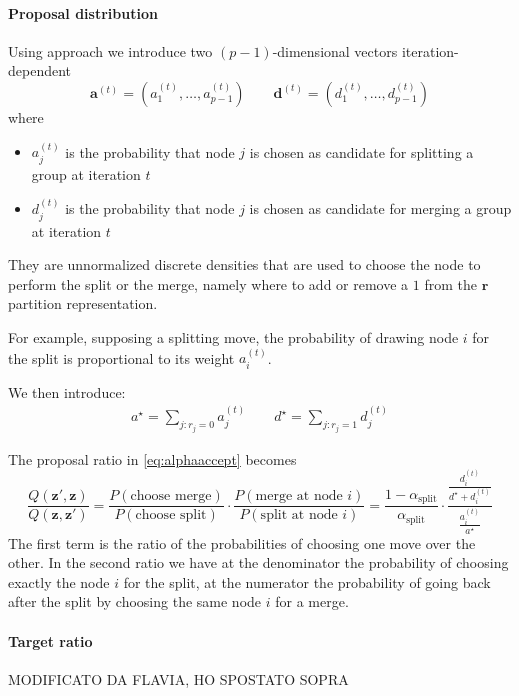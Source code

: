 \paragraph{Proposal distribution}\label{par:proposalratio}

Using \textcite{bensonAdaptiveMCMCMultiple2018} approach we introduce two $( p-1)$-dimensional vectors iteration-dependent
\begin{equation*}
\mathbf{a}^{( t)} =( a_{1}^{( t)} ,\dotsc ,a_{p-1}^{( t)}) \qquad \mathbf{d}^{( t)} =( d_{1}^{( t)} ,\dotsc ,d_{p-1}^{( t)})
\end{equation*}
where
\begin{itemize}
\item $a_{j}^{( t)}$ is the probability that node $j$ is chosen as candidate for splitting a group at iteration $t$
\item $d_{j}^{( t)}$ is the probability that node $j$ is chosen as candidate for merging a group at iteration $t$
\end{itemize}
They are unnormalized discrete densities that are used to choose the node to perform the split or the merge, namely where to add or remove a $1$ from the $\bm{r}$ partition representation.

For example, supposing a splitting move, the probability of drawing node $i$ for the split is proportional to its weight $a_{i}^{(t)}$.

We then introduce:
\begin{align*}
    a^{\star} = \sum\nolimits_{j:r_j=0}{a_{j}^{(t)}} \qquad d^{\star} = \sum\nolimits_{j:r_j=1}{d_{j}^{(t)}}
\end{align*}

The proposal ratio in \eqref{eq:alphaaccept} becomes
\[
    \frac{Q(\bm{z}',\bm{z})}{Q(\bm{z},\bm{z}')}
    =
    \frac{P(\text{choose merge})}{P(\text{choose split})}
    \cdot 
    \frac{P(\text{merge at node $i$})}{P(\text{split at node $i$})}
    =
    \frac{1-\alpha_{\text{split}}}{\alpha_{\text{split}}}
    \cdot
    \frac{\frac{d_{i}^{(t)}}{d^{\star}+d_{i}^{(t)}}}{\frac{a_{i}^{(t)}}{a^{\star}}}
\]
The first term is the ratio of the probabilities of choosing one move over the other. In the second ratio we have at the denominator the probability of choosing exactly the node $i$ for the split, at the numerator the probability of going back after the split  by choosing the same node $i$ for a merge.

\paragraph{Target ratio}
MODIFICATO DA FLAVIA, HO SPOSTATO SOPRA


